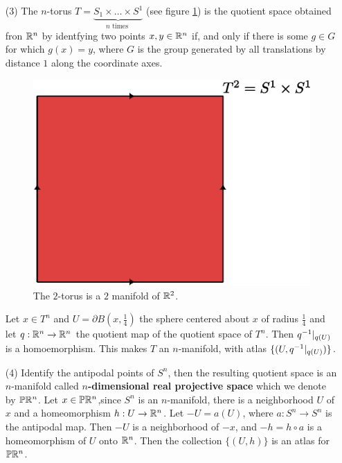 \begin{example}
\begin{enumerate}
             \item[(3)] The $n$-torus  $T=\underbrace{S_1 \times \dots \times
                 S^1}_{n \text{ times }}$ (see figure \ref{fig_1.2}) is the quotient
                 space obtained fron $\mathbb{R}^n$ by identfying two points  $x,y \in \mathbb{R}^n$
                 if, and only if there is some $g \in G$ for which $g(x)=y$,
                 where $G$ is the group generated by all translations by distance
                 $1$ along the coordinate axes.
                 \begin{figure}[h]
                     \centering
                     \includegraphics[scale=0.5]{Figures/Chapter1/2_torus.eps}
                     \caption{The $2$-torus is a  $2$ manifold of  $\mathbb{R}^2$.}
                     \label{fig_1.2}
                 \end{figure}
                 Let $x \in T^n$ and  $U=\partial{B(x,\frac{1}{4})}$ the
                 sphere centered about $x$ of radius $\frac{1}{4}$ and let
                 $q:\mathbb{R}^n \xrightarrow{} \mathbb{R}^n$ the quotient map of the quotient
                 space of $T^n$. Then  $q^{-1}|_{q(U)}$ is a homoemorphism.
                 This makes $T$ an  $n$-manifold, with atlas
                 $\{(U,q^{-1}|_{q(U)})\}$.

             \item[(4)] Identify the antipodal points of $S^n$, then the
                 resulting quotient space is an $n$-manifold called
                 \textbf{$n$-dimensional real projective space} which we denote
                 by $\mathbb{P}\mathbb{R}^n$. Let $x \in \mathbb{P}\mathbb{R}^n$,since $S^n$ is an  $n$-manifold,
                 there is a neighborhood  $U$ of  $x$ and a homeomorphism $h:U
                 \xrightarrow{} \mathbb{R}^n$. Let $-U=a(U)$, where $a:S^n \xrightarrow{}
                 S^n$ is the antipodal map. Then $-U$ is a neighborhood of
                 $-x$, and  $-h=h \circ a$ is a homeomorphism of  $U$ onto
                 $\mathbb{R}^n$. Then the collection  $\{(U,h)\}$ is an atlas for
                 $\mathbb{P}\mathbb{R}^n$.
    \end{enumerate}
\end{example}

